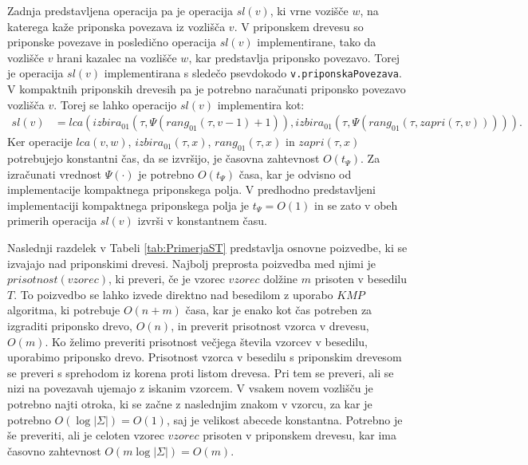 Zadnja predstavljena operacija pa je operacija $sl(v)$, ki vrne vozišče $w$, na katerega kaže priponska povezava iz vozlišča $v$. V priponskem drevesu so priponske povezave in posledično operacija $sl(v)$ implementirane, tako da vozlišče $v$ hrani kazalec na vozlišče $w$, kar predstavlja priponsko povezavo. Torej je operacija $sl(v)$ implementirana s sledečo psevdokodo \verb|v.priponskaPovezava|. V kompaktnih priponskih drevesih pa je potrebno naračunati priponsko povezavo vozlišča $v$. Torej se lahko operacijo $sl(v)$ implementira kot:
\begin{equation*}
\begin{split}
    sl(v)&=lca(izbira_{01}(\tau,\Psi(rang_{01}(\tau,v-1)+1)),izbira_{01}(\tau,\Psi(rang_{01}(\tau,zapri(\tau,v))))).
\end{split}   
\end{equation*}
Ker operacije $lca(v,w)$, $izbira_{01}(\tau,x)$, $rang_{01}(\tau,x)$ in $zapri(\tau,x)$ potrebujejo konstantni čas, da se izvršijo, je časovna zahtevnost $O(t_\Psi)$. Za izračunati vrednost $\Psi(\cdot)$ je potrebno $O(t_\Psi)$ časa, kar je odvisno od implementacije kompaktnega priponskega polja. V predhodno predstavljeni implementaciji kompaktnega priponskega polja je $t_\Psi=O(1)$ in se zato v obeh primerih operacija $sl(v)$ izvrši v konstantnem času.

Naslednji razdelek v Tabeli \ref{tab:PrimerjaST} predstavlja osnovne poizvedbe, ki se izvajajo nad priponskimi drevesi. Najbolj preprosta poizvedba med njimi je $prisotnost(vzorec)$, ki preveri, če je vzorec $vzorec$ dolžine $m$ prisoten v besedilu $T$. To poizvedbo se lahko izvede direktno nad besedilom z uporabo $KMP$ algoritma, ki potrebuje $O(n+m)$ časa, kar je enako kot čas potreben za izgraditi priponsko drevo, $O(n)$, in preverit prisotnost vzorca v drevesu, $O(m)$. Ko želimo preveriti prisotnost večjega števila vzorcev v besedilu, uporabimo priponsko drevo. Prisotnost vzorca v besedilu s priponskim drevesom se preveri s sprehodom iz korena proti listom drevesa. Pri tem se preveri, ali se nizi na povezavah ujemajo z iskanim vzorcem. V vsakem novem vozlišču je potrebno najti otroka, ki se začne z naslednjim znakom v vzorcu, za kar je potrebno $O(\log|\Sigma|)=O(1)$, saj je velikost abecede konstantna. Potrebno je še preveriti, ali je celoten vzorec $vzorec$ prisoten v priponskem drevesu, kar ima časovno zahtevnost $O(m\log|\Sigma|)=O(m)$. 

